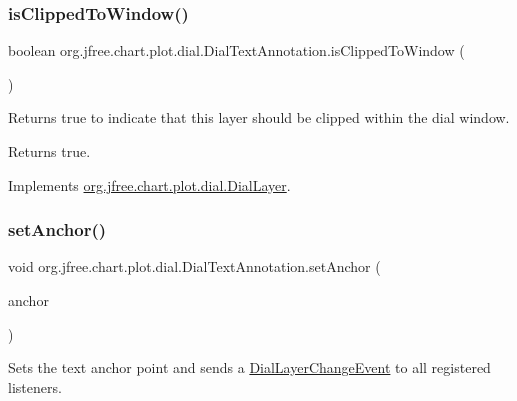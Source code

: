 \subsubsection{\texorpdfstring{is\+Clipped\+To\+Window()}{isClippedToWindow()}}
{\footnotesize\ttfamily boolean org.\+jfree.\+chart.\+plot.\+dial.\+Dial\+Text\+Annotation.\+is\+Clipped\+To\+Window (\begin{DoxyParamCaption}{ }\end{DoxyParamCaption})}

Returns {\ttfamily true} to indicate that this layer should be clipped within the dial window.

\begin{DoxyReturn}{Returns}
{\ttfamily true}. 
\end{DoxyReturn}


Implements \mbox{\hyperlink{interfaceorg_1_1jfree_1_1chart_1_1plot_1_1dial_1_1_dial_layer_a822eeadbe31b48827497714abeda2190}{org.\+jfree.\+chart.\+plot.\+dial.\+Dial\+Layer}}.

\mbox{\label{classorg_1_1jfree_1_1chart_1_1plot_1_1dial_1_1_dial_text_annotation_adb70dd46a09f66cba42bca86d1c59f0a}} 
\subsubsection{\texorpdfstring{set\+Anchor()}{setAnchor()}}
{\footnotesize\ttfamily void org.\+jfree.\+chart.\+plot.\+dial.\+Dial\+Text\+Annotation.\+set\+Anchor (\begin{DoxyParamCaption}\item[{Text\+Anchor}]{anchor }\end{DoxyParamCaption})}

Sets the text anchor point and sends a \mbox{\hyperlink{classorg_1_1jfree_1_1chart_1_1plot_1_1dial_1_1_dial_layer_change_event}{Dial\+Layer\+Change\+Event}} to all registered listeners.


